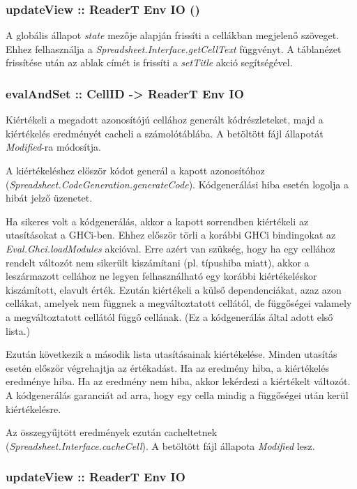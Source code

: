 \subsubsection{updateView :: ReaderT Env IO ()}

A globális állapot \textit{state} mezője alapján frissíti a cellákban megjelenő szöveget. Ehhez felhasználja a \textit{Spreadsheet.Interface.getCellText} függvényt. A táblanézet frissítése után az ablak címét is frissíti a \textit{setTitle} akció segítségével.

\subsubsection{evalAndSet :: CellID -> ReaderT Env IO}

Kiértékeli a megadott azonosítójú cellához generált kódrészleteket, majd a kiértékelés eredményét cacheli a számolótáblába. A betöltött fájl állapotát \textit{Modified}-ra módosítja.

A kiértékeléshez először kódot generál a kapott azonosítóhoz \mbox{(\textit{Spreadsheet.CodeGeneration.generateCode})}. Kódgenerálási hiba esetén logolja a hibát jelző üzenetet. 

Ha sikeres volt a kódgenerálás, akkor a kapott sorrendben kiértékeli az utasításokat a GHCi-ben. Ehhez először törli a korábbi GHCi bindingokat az \textit{Eval.Ghci.loadModules} akcióval. Erre azért van szükség, hogy ha egy cellához rendelt változót nem sikerült kiszámítani (pl. típushiba miatt), akkor a leszármazott cellához ne legyen felhasználható egy korábbi kiértékeléskor kiszámított, elavult érték. Ezután kiértékeli a külső dependenciákat, azaz azon cellákat, amelyek nem függnek a megváltoztatott cellától, de függőségei valamely  a megváltoztatott cellától függő cellának. (Ez a kódgenerálás által adott első lista.)

Ezután következik a második lista utasításainak kiértékelése. Minden utasítás esetén először végrehajtja az értékadást. Ha az eredmény hiba, a kiértékelés eredménye hiba. Ha az eredmény nem hiba, akkor lekérdezi a kiértékelt változót. A kódgenerálás garanciát ad arra, hogy egy cella mindig a függőségei után kerül kiértékelésre.

Az összegyűjtött eredmények ezután cacheltetnek \mbox{(\textit{Spreadsheet.Interface.cacheCell})}. A betöltött fájl állapota \textit{Modified} lesz.

\subsubsection{updateView :: ReaderT Env IO}

